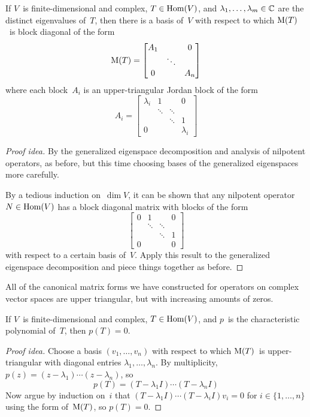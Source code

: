 \begin{thm}
If \(V\)~is finite-dimensional and complex, \(T\in\operatorname{Hom}(V)\), and \(\lambda_1,\ldots,\lambda_m\in\mathbb{C}\) are the distinct eigenvalues of~\(T\), then there is a basis of~\(V\) with respect to which \(\operatorname{M}(T)\)~is block diagonal of the form
\[\operatorname{M}(T)=\left[\begin{matrix}
A_1&&0\\
&\ddots&\\
0&&A_n
\end{matrix}\right]\]
where each block~\(A_i\) is an upper-triangular Jordan block of the form
\[A_i=\left[\begin{matrix}
\lambda_i&1&&0\\
&\ddots&\ddots&\\
&&\ddots&1\\
0&&&\lambda_i
\end{matrix}\right]\]
\end{thm}
\begin{proof}[Proof idea]
By the generalized eigenspace decomposition and analysis of nilpotent operators, as before, but this time choosing bases of the generalized eigenspaces more carefully.

By a tedious induction on~\(\dim V\), it can be shown that any nilpotent operator \(N\in\operatorname{Hom}(V)\) has a block diagonal matrix with blocks of the form
\[\left[\begin{matrix}
0&1&&0\\
&\ddots&\ddots&\\
&&\ddots&1\\
0&&&0
\end{matrix}\right]\]
with respect to a certain basis of~\(V\). Apply this result to the generalized eigenspace decomposition and piece things together as before.
\end{proof}

\begin{rmk}
All of the canonical matrix forms we have constructed for operators on complex vector spaces are upper triangular, but with increasing amounts of zeros.
\end{rmk}

\begin{thm}
If \(V\)~is finite-dimensional and complex, \(T\in\operatorname{Hom}(V)\), and \(p\)~is the characteristic polynomial of~\(T\), then \(p(T)=0\).
\end{thm}
\begin{proof}[Proof idea]
Choose a basis \((v_1,\ldots,v_n)\) with respect to which \(\operatorname{M}(T)\)~is upper-triangular with diagonal entries \(\lambda_1,\ldots,\lambda_n\). By multiplicity, \(p(z)=(z-\lambda_1)\cdots(z-\lambda_n)\), so
\[p(T)=(T-\lambda_1 I)\cdots(T-\lambda_n I)\]
Now argue by induction on~\(i\) that \((T-\lambda_1 I)\cdots(T-\lambda_i I)v_i=0\) for \(i\in\{1,\ldots,n\}\) using the form of~\(\operatorname{M}(T)\), so \(p(T)=0\).
\end{proof}

